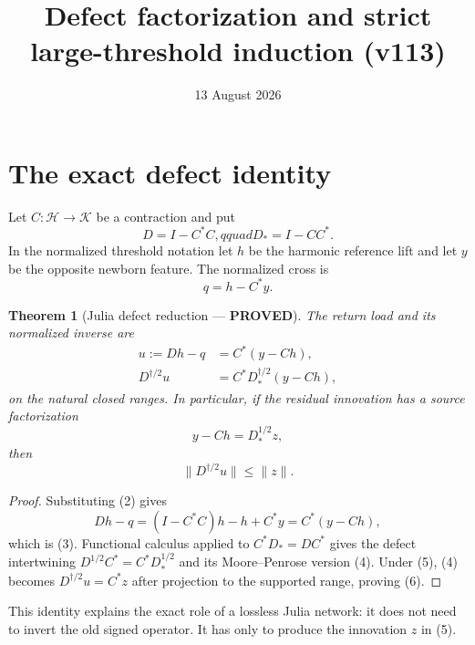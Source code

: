 \documentclass[11pt]{article}
\title{Defect factorization and strict large-threshold induction (v113)}
\date{13 August 2026}
\newcommand{\PROVED}{\textcolor{green!40!black}{\textbf{PROVED}}}
\newtheorem{theorem}{Theorem}
\begin{document}
\maketitle

\section{The exact defect identity}

Let $C:\mathscr H\to\mathscr K$ be a contraction and put
\begin{equation}
 D=I-C^*C,qquad D_*=I-CC^*.                                  \tag{1}
\end{equation}
In the normalized threshold notation let $h$ be the harmonic reference
lift and let $y$ be the opposite newborn feature.  The normalized cross is
\begin{equation}
 q=h-C^*y.                                                     \tag{2}
\end{equation}

\begin{theorem}[Julia defect reduction --- \PROVED]
The return load and its normalized inverse are
\begin{align}
 u:=Dh-q&=C^*(y-Ch),                                          \tag{3}\\
 D^{\dagger/2}u&=C^*D_*^{\dagger/2}(y-Ch),                    \tag{4}
\end{align}
on the natural closed ranges.  In particular, if the residual innovation
has a source factorization
\begin{equation}
                         y-Ch=D_*^{1/2}z,                      \tag{5}
\end{equation}
then
\begin{equation}
                         \|D^{\dagger/2}u\|\le\|z\|.          \tag{6}
\end{equation}
\end{theorem}

\begin{proof}
Substituting (2) gives
\[
 Dh-q=(I-C^*C)h-h+C^*y=C^*(y-Ch),
\]
which is (3).  Functional calculus applied to
$C^*D_*=DC^*$ gives the defect intertwining
$D^{1/2}C^*=C^*D_*^{1/2}$ and its Moore--Penrose version (4).  Under (5),
(4) becomes $D^{\dagger/2}u=C^*z$ after projection to the supported
range, proving (6).
\end{proof}

This identity explains the exact role of a lossless Julia network: it does
not need to invert the old signed operator.  It has only to produce the
innovation $z$ in (5).
\end{document}
